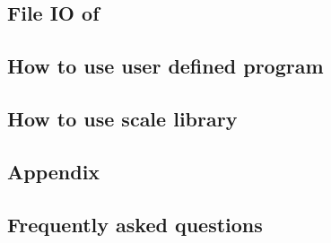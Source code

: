 \documentclass[a4paper]{report}
\begin{document}
 \chapter{File IO of \scalelib}
 

 \chapter{How to use user defined program}
 \chapter{How to use scale library}
 
 




\begin{appendix}
\part{Appendix}
\chapter{Frequently asked questions} \label{achap:practice}


\end{appendix}


\ClearWallPaper

\end{document}
